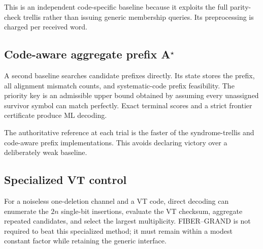 \documentclass[11pt]{article}
\theoremstyle{definition}
\theoremstyle{remark}
\begin{document}
This is an independent code-specific baseline because it exploits the full parity-check trellis rather than issuing generic membership queries.  Its preprocessing is charged per received word.

\subsection{Code-aware aggregate prefix A$^\star$}
A second baseline searches candidate prefixes directly.  Its state stores the prefix, all alignment mismatch counts, and systematic-code prefix feasibility.  The priority key is an admissible upper bound obtained by assuming every unassigned survivor symbol can match perfectly.  Exact terminal scores and a strict frontier certificate produce ML decoding.

The authoritative reference at each trial is the faster of the syndrome-trellis and code-aware prefix implementations.  This avoids declaring victory over a deliberately weak baseline.

\subsection{Specialized VT control}
For a noiseless one-deletion channel and a VT code, direct decoding can enumerate the $2n$ single-bit insertions, evaluate the VT checksum, aggregate repeated candidates, and select the largest multiplicity.  FIBER--GRAND is not required to beat this specialized method; it must remain within a modest constant factor while retaining the generic interface.
\end{document}
